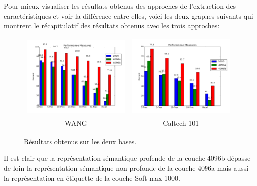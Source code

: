 	Pour mieux visualiser les résultats obtenus des approches de l'extraction des caractéristiques et voir la différence entre elles, voici les deux graphes suivants qui montrent le récapitulatif des résultats obtenus avec les trois approches:

\begin{figure}[H]
\centering
\begin{tabular}{cc}
\centering

\includegraphics[width=9cm]{Figures/results/res-wang1.png}
&
\includegraphics[width=9cm]{Figures/results/res-caltech1.png}\\
WANG & Caltech-101\\
\end{tabular}
\caption[comp7]{Résultats obtenus sur les deux bases.}
\end{figure}

	Il est clair que la représentation sémantique profonde de la couche 4096b dépasse de loin la représentation sémantique non profonde de la couche 4096a mais aussi la représentation en étiquette de la couche Soft-max 1000.	




